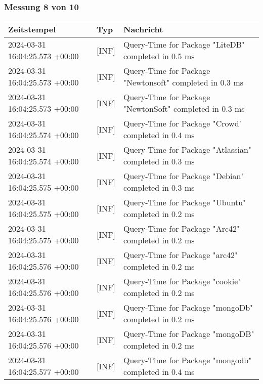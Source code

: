     \subsubsection{Messung 8 von 10} \label{subsubsec:MySQLMitIndex8von10}
        {
            {\small
                \begin{tabularx}{\textwidth}{|l|l|X|}
                    \hline
                    \textbf{Zeitstempel} & \textbf{Typ} & \textbf{Nachricht} \\
                    \hline
                    \endhead
                    2024-03-31 16:04:25.573 +00:00 & [INF] & Query-Time for Package "LiteDB" completed in 0.5 ms \\
                    2024-03-31 16:04:25.573 +00:00 & [INF] & Query-Time for Package "Newtonsoft" completed in 0.3 ms \\
                    2024-03-31 16:04:25.573 +00:00 & [INF] & Query-Time for Package "NewtonSoft" completed in 0.3 ms \\
                    2024-03-31 16:04:25.574 +00:00 & [INF] & Query-Time for Package "Crowd" completed in 0.4 ms \\
                    2024-03-31 16:04:25.574 +00:00 & [INF] & Query-Time for Package "Atlassian" completed in 0.3 ms \\
                    2024-03-31 16:04:25.575 +00:00 & [INF] & Query-Time for Package "Debian" completed in 0.3 ms \\
                    2024-03-31 16:04:25.575 +00:00 & [INF] & Query-Time for Package "Ubuntu" completed in 0.2 ms \\
                    2024-03-31 16:04:25.575 +00:00 & [INF] & Query-Time for Package "Arc42" completed in 0.2 ms \\
                    2024-03-31 16:04:25.576 +00:00 & [INF] & Query-Time for Package "arc42" completed in 0.2 ms \\
                    2024-03-31 16:04:25.576 +00:00 & [INF] & Query-Time for Package "cookie" completed in 0.2 ms \\
                    2024-03-31 16:04:25.576 +00:00 & [INF] & Query-Time for Package "mongoDb" completed in 0.2 ms \\
                    2024-03-31 16:04:25.576 +00:00 & [INF] & Query-Time for Package "mongoDB" completed in 0.2 ms \\
                    2024-03-31 16:04:25.577 +00:00 & [INF] & Query-Time for Package "mongodb" completed in 0.4 ms \\

\end{tabularx}}}

